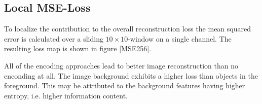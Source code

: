 \documentclass{article}
\begin{document}
\subsection{Local MSE-Loss}
\label{LocalMSE}
To localize the contribution to the overall reconstruction loss the mean squared error is calculated over a sliding $10\times10$-window on a single channel. The resulting loss map is shown in figure \ref{MSE256}.

All of the encoding approaches lead to better image reconstruction than no enconding at all. The image background exhibits a higher loss than objects in the foreground. This may be attributed to the background features having higher entropy, i.e. higher information content. 
\end{document}
